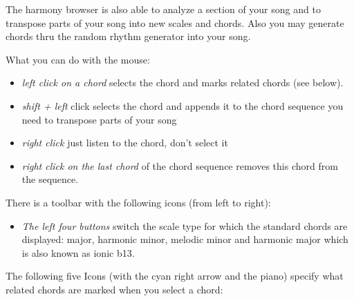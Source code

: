 \documentclass[letterpaper]{report}
\begin{document}
The harmony browser is also able to analyze a section of your song and
to transpose parts of your song into new scales and chords. Also you may generate
chords thru the random rhythm generator into your song.

What you can do with the mouse:
\begin{itemize}
\item {\em left click on a chord} selects the chord and marks related chords (see below).
\item {\em shift + left} click selects the chord and appends it to the chord sequence
you need to transpose parts of your song
\item {\em right click} just listen to the chord, don't select it
\item {\em right click on the last chord} of the chord sequence removes this
chord from the sequence.
\end{itemize}

There is a toolbar with the following icons (from left to right):

\begin{itemize}

\item {\em The left four buttons} switch the scale type for which the standard
chords are displayed: major, harmonic minor, melodic minor and harmonic
major which is also known as ionic b13.

\end{itemize}

The following five Icons (with the cyan right arrow and the piano)
specify what related chords are marked when you select a chord:
\end{document}
